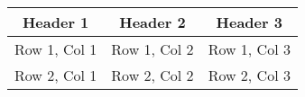 \documentclass{article}
\begin{document}
\begin{table}[ht]
\centering
\begin{tabular}{|c|c|c|}
\hline
Header 1 & Header 2 & Header 3 \\
\hline
Row 1, Col 1 & Row 1, Col 2 & Row 1, Col 3 \\
\hline
Row 2, Col 1 & Row 2, Col 2 & Row 2, Col 3 \\
\hline
\end{tabular}
\end{table}
\end{document}
